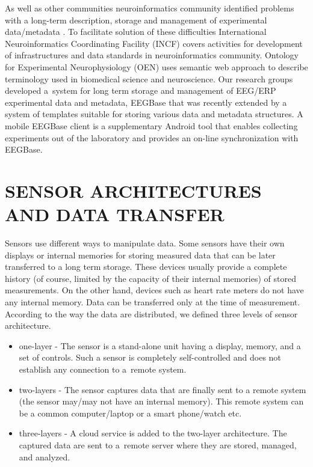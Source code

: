 \documentclass[a4paper,twoside]{article}
\begin{document}
As well as other communities neuroinformatics community identified problems with a long-term description, storage and management of experimental data/metadata \cite{CRCNS}. To facilitate solution of these difficulties International Neuroinformatics Coordinating Facility (INCF) \cite{INCF} covers activities for development of infrastructures and data standards in neuroinformatics community. Ontology for Experimental Neurophysiology (OEN) \cite{10.3389/conf.fninf.2014.18.00044} uses semantic web approach to describe terminology used in biomedical science and neuroscience. Our research groups developed a~system for long term storage and management of EEG/ERP experimental data and metadata, EEGBase \cite{ISI:000306821100004} that was recently extended by a system of templates suitable for storing various data and metadata structures. A mobile EEGBase client \cite{10.3389/conf.fninf.2013.09.00046} is a supplementary Android tool that enables collecting experiments out of the laboratory and provides an on-line synchronization with EEGBase.


\section{\uppercase{Sensor Architectures and Data Transfer}}
\label{topology_data_transfer}

\noindent
Sensors use different ways to manipulate data. Some sensors have their own displays or internal memories for storing measured data that can be later transferred to a long term storage. These devices usually provide a complete history (of course, limited by the capacity of their internal memories) of stored measurements. On the other hand, devices such as heart rate meters do not have any internal memory. Data can be transferred only at the time of measurement. According to the way the data are distributed, we defined three levels of sensor architecture.

\begin{itemize}
 \item one-layer - The sensor is a stand-alone unit having a display, memory, and a set of controls. Such a sensor is completely self-controlled and does not establish any connection to a~remote system.
 \item two-layers - The sensor captures data that are finally sent to a remote system (the sensor may/may not have an internal memory). This remote system can be a common computer/laptop or a smart phone/watch etc.
 \item three-layers - A cloud service is added to the two-layer architecture. The captured data are sent to a~remote server where they are stored, managed, and analyzed.
\end{itemize}
\end{document}
